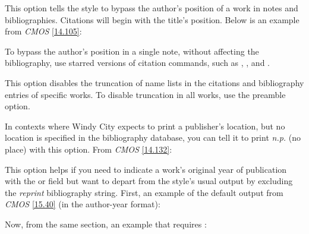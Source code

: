 \documentclass[11pt,letterpaper,oneside]{article}
\begin{document}
\begin{optionlist}

\noindent This option tells the style to bypass the author's position
of a work in notes and bibliographies. Citations will begin with the
title's position. Below is an example from \textit{CMOS} \ref{14.105}:

\begin{citebib}
\item \cite{chaucer1966}
\end{citebib}

\noindent To bypass the author's position in a single note, without
affecting the bibliography, use starred versions of citation commands,
such as , , and .


\noindent This option disables the truncation of name lists in the
citations and bibliography entries of specific works. To disable
truncation in all works, use the  preamble option.


\noindent In contexts where Windy City expects to print a publisher's
location, but no location is specified in the bibliography database,
you can tell it to print \textit{n.p.} (no place) with this option.
From \textit{CMOS} \ref{14.132}:

\begin{citeonly}
\item[] \cite{windsor1910}
\end{citeonly}


\noindent This option helps if you need to indicate a work's original
year of publication with the  or
 field but want to depart from the style's usual
output by excluding the \textit{reprint} bibliography string. First,
an example of the default output from \textit{CMOS} \ref{15.40} (in
the author-year format):

\begin{refonly}
\nocite{maitland1998}
\end{refonly}

\noindent Now, from the same section, an example that requires
:


\end{optionlist}
\end{document}
